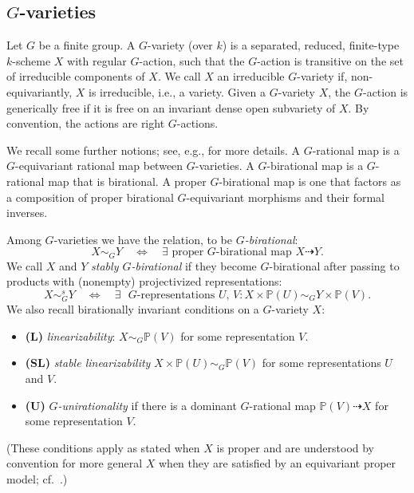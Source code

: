 \documentclass[12pt, reqno]{amsart}
\numberwithin{equation}{section}
\theoremstyle{plain}
\theoremstyle{definition}
\def\bP{{\mathbb P}}
\begin{document}
\subsection*{$G$-varieties}
Let $G$ be a finite group.
A $G$-variety (over $k$) is a separated, reduced, finite-type $k$-scheme $X$ with regular $G$-action, such that the $G$-action is transitive on the set of irreducible components of $X$.
We call $X$ an irreducible $G$-variety if, non-equivariantly, $X$ is irreducible, i.e., a variety.
Given a $G$-variety $X$, the $G$-action is generically free if it is free on an invariant dense open subvariety of $X$.
By convention, the actions are right $G$-actions.

We recall some further notions; see, e.g., \cite[\S 3.1]{KTsurvey} for more details.
A $G$-rational map is a $G$-equivariant rational map between $G$-varieties.
A $G$-birational map is a $G$-rational map that is birational.
A proper $G$-birational map is one that factors as a composition of proper birational $G$-equivariant morphisms and their formal inverses.





Among $G$-varieties we have the relation, to be \emph{$G$-birational}:
\[ X\sim_GY\quad\Leftrightarrow\quad
\exists\text{ proper $G$-birational map $X\dashrightarrow Y$}. \]
We call $X$ and $Y$ \emph{stably $G$-birational} if they become $G$-birational after passing to products with (nonempty) projectivized representations:
\[ X\sim_G^sY\quad \Leftrightarrow\quad
\exists\text{ $G$-representations $U$, $V$}\colon X\times \bP(U)\sim_G Y\times \bP(V). \]
We also recall birationally invariant conditions on a $G$-variety $X$:
\begin{itemize}
\item \textbf{(L)} \emph{linearizability}: $X\sim_G\bP(V)$ for some representation $V$.
\item \textbf{(SL)} \emph{stable linearizability} $X\times \bP(U)\sim_G\bP(V)$ for some representations $U$ and $V$.
\item \textbf{(U)} \emph{$G$-unirationality} if there is a dominant $G$-rational map $\bP(V)\dashrightarrow X$ for some representation $V$.
\end{itemize}
(These conditions apply as stated when $X$ is proper and are understood by convention for more general $X$ when they are satisfied by an equivariant proper model; cf.\ \cite[\S 3.1]{KTsurvey}.)
\end{document}

